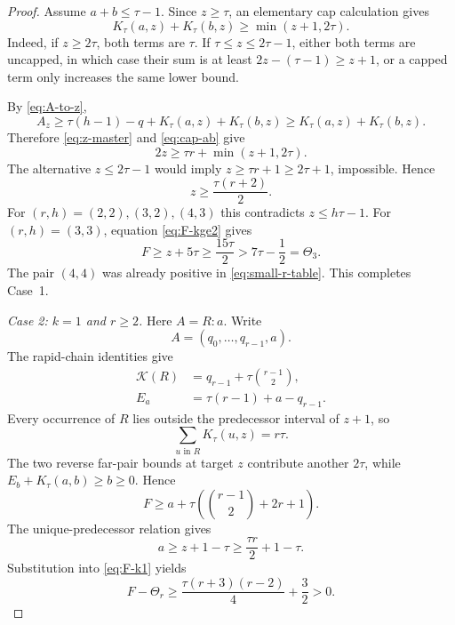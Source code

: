 \documentclass[11pt]{article}
\theoremstyle{definition}
\theoremstyle{remark}
\newcommand{\kap}{\mathcal K}
\begin{document}
\begin{proof}
Assume $a+b\le\tau-1$.  Since $z\ge\tau$, an elementary cap
calculation gives
\begin{equation}
 K_\tau(a,z)+K_\tau(b,z)\ge\min(z+1,2\tau).
 \label{eq:cap-ab}
\end{equation}
Indeed, if $z\ge2\tau$, both terms are $\tau$.  If
$\tau\le z\le2\tau-1$, either both terms are uncapped, in which case
their sum is at least $2z-(\tau-1)\ge z+1$, or a capped term only
increases the same lower bound.

By \eqref{eq:A-to-z},
\[
 A_z\ge\tau(h-1)-q+K_\tau(a,z)+K_\tau(b,z)
 \ge K_\tau(a,z)+K_\tau(b,z).
\]
Therefore \eqref{eq:z-master} and \eqref{eq:cap-ab} give
\[
 2z\ge\tau r+\min(z+1,2\tau).
\]
The alternative $z\le2\tau-1$ would imply
$z\ge\tau r+1\ge2\tau+1$, impossible.  Hence
\begin{equation}
 z\ge\frac{\tau(r+2)}2.
 \label{eq:z-improved}
\end{equation}
For $(r,h)=(2,2),(3,2),(4,3)$ this contradicts $z\le h\tau-1$.
For $(r,h)=(3,3)$, equation \eqref{eq:F-kge2} gives
\[
 F\ge z+5\tau\ge\frac{15\tau}{2}>7\tau-\frac12=\Theta_3.
\]
The pair $(4,4)$ was already positive in \eqref{eq:small-r-table}.
This completes Case~1.

\medskip
\noindent\emph{Case 2: $k=1$ and $r\ge2$.}
Here $A=R:a$.  Write
\[
 A=(q_0,\ldots,q_{r-1},a).
\]
The rapid-chain identities give
\begin{align}
 \kap(R)&=q_{r-1}+\tau\binom{r-1}{2},
 \label{eq:KR-k1}\\
 E_a&=\tau(r-1)+a-q_{r-1}.
 \label{eq:Ea-k1}
\end{align}
Every occurrence of $R$ lies outside the predecessor interval of
$z+1$, so
\begin{equation}
 \sum_{u\text{ in }R}K_\tau(u,z)=r\tau.
 \label{eq:R-to-z-k1}
\end{equation}
The two reverse far-pair bounds at target $z$ contribute another
$2\tau$, while $E_b+K_\tau(a,b)\ge b\ge0$.  Hence
\begin{equation}
 F\ge a+\tau\left(\binom{r-1}{2}+2r+1\right).
 \label{eq:F-k1}
\end{equation}
The unique-predecessor relation gives
\[
 a\ge z+1-\tau\ge\frac{\tau r}{2}+1-\tau.
\]
Substitution into \eqref{eq:F-k1} yields
\begin{equation}
 F-\Theta_r\ge
 \frac{\tau(r+3)(r-2)}4+\frac32>0.
 \label{eq:F-k1-positive}
\end{equation}


\end{proof}
\end{document}
